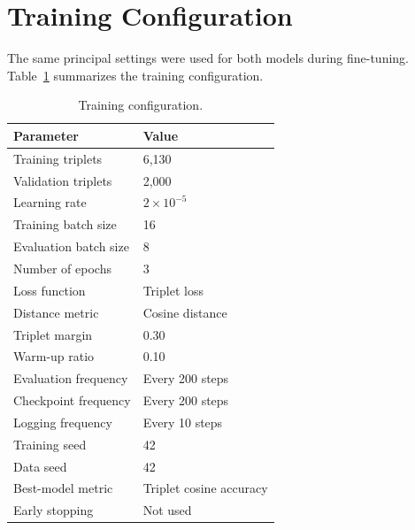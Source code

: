 \documentclass{article}
\begin{document}

\appendix
\renewcommand{\thesection}{Appendix \Alph{section}}


\section{Training Configuration}
\label{sec:appendix-training}

The same principal settings were used for both models during fine-tuning.
Table~\ref{tab:training-config} summarizes the training configuration.

\begin{table}[h]
  \caption{Training configuration.}
  \label{tab:training-config}
  \centering
  \begin{tabular}{ll}
    \toprule
    Parameter & Value \\
    \midrule
    Training triplets       & 6{,}130 \\
    Validation triplets     & 2{,}000 \\
    Learning rate            & $2 \times 10^{-5}$ \\
    Training batch size      & 16 \\
    Evaluation batch size    & 8 \\
    Number of epochs         & 3 \\
    Loss function            & Triplet loss \\
    Distance metric          & Cosine distance \\
    Triplet margin           & 0.30 \\
    Warm-up ratio            & 0.10 \\
    Evaluation frequency     & Every 200 steps \\
    Checkpoint frequency     & Every 200 steps \\
    Logging frequency        & Every 10 steps \\
    Training seed            & 42 \\
    Data seed                & 42 \\
    Best-model metric        & Triplet cosine accuracy \\
    Early stopping           & Not used \\
    \bottomrule
  \end{tabular}
\end{table}
\end{document}
